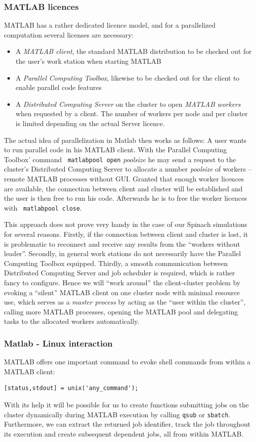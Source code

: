 \documentclass[11.5pt,a4paper]{article}
\begin{document}
\subsubsection{MATLAB licences}
MATLAB has a rather dedicated licence model, and for a parallelized computation several licenses are necessary:
\begin{itemize}
 \item A \emph{MATLAB client}, the standard MATLAB distribution to be checked out for the user's work station when starting MATLAB
\item A \emph{Parallel Computing Toolbox}, likewise to be checked out for the client to enable parallel code features
\item A \emph{Distributed Computing Server} on the cluster to open \emph{MATLAB workers} when requested by a client. The number of workers per node and per cluster is limited depending on the actual Server licence.
\end{itemize}
The actual idea of parallelization in Matlab then works as follows: A user wants to run parallel code in his MATLAB client. With the Parallel Computing Toolbox' command \verb$ matlabpool open$ \emph{poolsize} he may send a request to the cluster's Distributed Computing Server to allocate a number \emph{poolsize} of workers -- remote MATLAB processes without GUI. Granted that enough worker licences are available, the connection between client and cluster will be established and the user is then free to run his code. Afterwards he is to free the worker licences with \verb$ matlabpool close$.

This approach does not prove very handy in the case of our Spinach simulations for several reasons. Firstly, if the connection between client and cluster is lost, it is problematic to reconnect and receive any results from the ``workers without leader''. Secondly, in general work stations do not necessarily have the Parallel Computing Toolbox equipped. Thirdly, a smooth communication between Distributed Computing Server and job scheduler is required, which is rather fancy to configure. Hence we will ``work around'' the client-cluster problem by evoking a ``silent'' MATLAB client on one cluster node with minimal resource use, which serves as a \emph{master process} by acting as the ``user within the cluster'', calling more MATLAB processes, opening the MATLAB pool and delegating tasks to the allocated workers automatically.

\subsubsection{Matlab - Linux interaction}
MATLAB offers one important command to evoke shell commands from within a MATLAB client:
\begin{lstlisting}
[status,stdout] = unix('any_command');
\end{lstlisting}
With its help it will be possible for us to create functions submitting jobs on the cluster dynamically during MATLAB execution by calling \verb$qsub$ or \verb$sbatch$. Furthermore, we can extract the returned job identifier, track the job throughout its execution and create subsequent dependent jobs, all from within MATLAB. 
\end{document}
